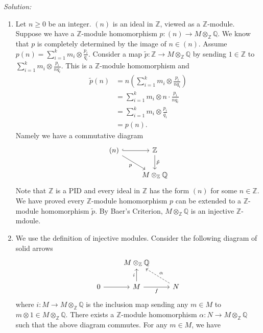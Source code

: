 \documentclass[a4paper, 12pt]{article}
\newenvironment{solution}
    {\textit{Solution:}}
    {}
\begin{document}
\begin{solution}
\begin{enumerate}[(1)]
\item Let \(n\geq 0\) be an integer. \((n)\) is an ideal in \(\mathbb{Z}\), viewed as a \(\mathbb{Z}\)-module. Suppose we have a \(\mathbb{Z}\)-module homomorphism \(p:(n)\rightarrow M\otimes_\mathbb{Z}\mathbb{Q}\). We know that 
\(p\) is completely determined by the image of \(n\in (n)\). Assume \(p(n)=\sum_{i=1}^{k}m_i\otimes \frac{p_i}{q_i}\). Consider a map \(\tilde{p}:\mathbb{Z}\rightarrow M\otimes_\mathbb{Z} \mathbb{Q}\) by sending \(1\in \mathbb{Z}\) to 
\(\sum_{i=1}^{k}m_i\otimes \frac{p_i}{nq_i}\). This is a \(\mathbb{Z}\)-module homomorphism and 
\begin{align*}
\tilde{p}(n)&=n(\sum_{i=1}^{k}m_i\otimes \frac{p_i}{nq_i})\\ 
            &=\sum_{i=1}^{k}m_i\otimes n\cdot \frac{p_i}{nq_i}\\ 
			&=\sum_{i=1}^k m_i\otimes \frac{p_i}{q_i}\\ 
			&=p(n).
\end{align*}
Namely we have a commutative diagram 
\[\begin{tikzcd}
	{(n)} & {\mathbb{Z}} \\
	& {M\otimes_\mathbb{Z}\mathbb{Q}}
	\arrow[hook, from=1-1, to=1-2]
	\arrow["p"', from=1-1, to=2-2]
	\arrow["{\tilde{p}}", from=1-2, to=2-2]
\end{tikzcd}\]
Note that \(\mathbb{Z}\) is a PID and every ideal in \(\mathbb{Z}\) has the form \((n)\) for some \(n\in \mathbb{Z}\). We have proved every \(\mathbb{Z}\)-module homomorphism \(p\) can be extended to a \(\mathbb{Z}\)-module homomorphism \(\tilde{p}\). By 
Baer's Criterion, \(M\otimes_\mathbb{Z}\mathbb{Q}\) is an injective \(\mathbb{Z}\)-mdoule. 
\item We use the definition of injective modules. Consider the following diagram of solid arrows 
\[\begin{tikzcd}
	& {M\otimes_\mathbb{Z}\mathbb{Q}} \\
	0 & M & N
	\arrow[from=2-1, to=2-2]
	\arrow["i", from=2-2, to=1-2]
	\arrow["f"', from=2-2, to=2-3]
	\arrow["\alpha"', dashed, from=2-3, to=1-2]
\end{tikzcd}\]
where \(i:M\rightarrow M\otimes_\mathbb{Z}\mathbb{Q}\) is the inclusion map sending any \(m\in M\) to \(m\otimes 1\in M\otimes_\mathbb{Z}\mathbb{Q}\). There exists a \(\mathbb{Z}\)-module homomorphism \(\alpha:N\rightarrow M\otimes_\mathbb{Z}\mathbb{Q}\) such that the above 
diagram commutes. For any \(m\in M\), we have 

\end{enumerate}
\end{solution}
\end{document}
